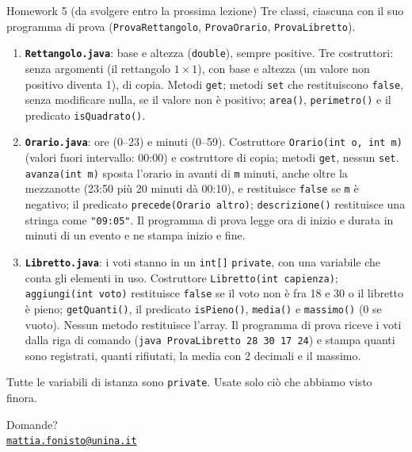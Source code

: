 \documentclass[10pt,aspectratio=169]{beamer}
\begin{document}
\begin{frame}{Homework 5 (da svolgere entro la prossima lezione)}
\small
Tre classi, ciascuna con il suo programma di prova (\texttt{ProvaRettangolo}, \texttt{ProvaOrario}, \texttt{ProvaLibretto}).
\begin{enumerate}\itemsep=3pt
    \item \textbf{\texttt{Rettangolo.java}}: base e altezza (\texttt{double}), sempre positive. Tre costruttori: senza argomenti (il rettangolo $1 \times 1$), con base e altezza (un valore non positivo diventa 1), di copia. Metodi \texttt{get}; metodi \texttt{set} che restituiscono \texttt{false}, senza modificare nulla, se il valore non è positivo; \texttt{area()}, \texttt{perimetro()} e il predicato \texttt{isQuadrato()}.
    \item \textbf{\texttt{Orario.java}}: ore (0--23) e minuti (0--59). Costruttore \texttt{Orario(int o, int m)} (valori fuori intervallo: 00:00) e costruttore di copia; metodi \texttt{get}, nessun \texttt{set}. \texttt{avanza(int m)} sposta l'orario in avanti di \texttt{m} minuti, anche oltre la mezzanotte (23:50 più 20 minuti dà 00:10), e restituisce \texttt{false} se \texttt{m} è negativo; il predicato \texttt{precede(Orario altro)}; \texttt{descrizione()} restituisce una stringa come \texttt{"09:05"}. Il programma di prova legge ora di inizio e durata in minuti di un evento e ne stampa inizio e fine.
    \item \textbf{\texttt{Libretto.java}}: i voti stanno in un \texttt{int[]} \texttt{private}, con una variabile che conta gli elementi in uso. Costruttore \texttt{Libretto(int capienza)}; \texttt{aggiungi(int voto)} restituisce \texttt{false} se il voto non è fra 18 e 30 o il libretto è pieno; \texttt{getQuanti()}, il predicato \texttt{isPieno()}, \texttt{media()} e \texttt{massimo()} (0 se vuoto). Nessun metodo restituisce l'array. Il programma di prova riceve i voti dalla riga di comando (\texttt{java ProvaLibretto 28 30 17 24}) e stampa quanti sono registrati, quanti rifiutati, la media con 2 decimali e il massimo.
\end{enumerate}

Tutte le variabili di istanza sono \texttt{private}. Usate solo ciò che abbiamo visto finora.
\end{frame}

\begin{frame}
\begin{center}
{\Huge Domande?}\\[2.5em]
{\normalsize \href{mailto:mattia.fonisto@unina.it}{\texttt{mattia.fonisto@unina.it}}}
\end{center}
\end{frame}
\end{document}
